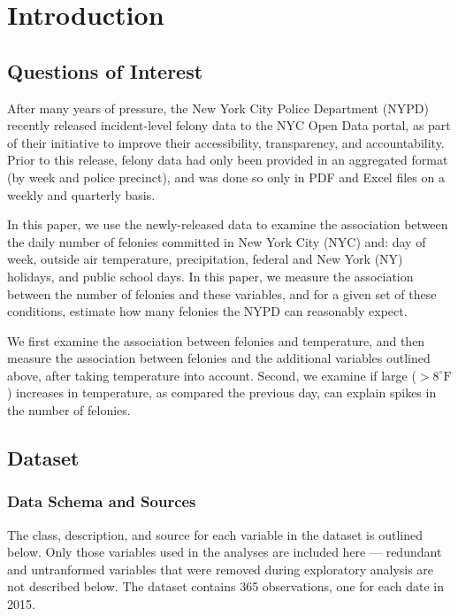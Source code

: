 \documentclass[11pt,notitlepage]{article}
\newcommand{\degf}{^\circ\text{F}}
\begin{document}
\pagebreak

\singlespacing



\section{Introduction}


\subsection{Questions of Interest}

After many years of pressure, the New York City Police Department (NYPD) recently released incident-level felony data to the NYC Open Data portal, as part of their initiative to improve their accessibility, transparency, and accountability. Prior to this release, felony data had only been provided in an aggregated format (by week and police precinct), and was done so only in PDF and Excel files on a weekly and quarterly basis.

In this paper, we use the newly-released data to examine the association between the daily number of felonies committed in New York City (NYC) and: day of week, outside air temperature, precipitation, federal and New York (NY) holidays, and public school days. In this paper, we measure the association between the number of felonies and these variables, and for a given set of these conditions, estimate how many felonies the NYPD can reasonably expect.

We first examine the association between felonies and temperature, and then measure the association between felonies and the additional variables outlined above, after taking temperature into account. Second, we examine if large ($>8 \degf$) increases in temperature, as compared the previous day, can explain spikes in the number of felonies.



\subsection{Dataset}

\subsubsection{Data Schema and Sources}

The class, description, and source for each variable in the dataset is outlined below. Only those variables used in the analyses are included here --- redundant and untranformed variables that were removed during exploratory analysis are not described below. The dataset contains 365 observations, one for each date in 2015.
\end{document}
